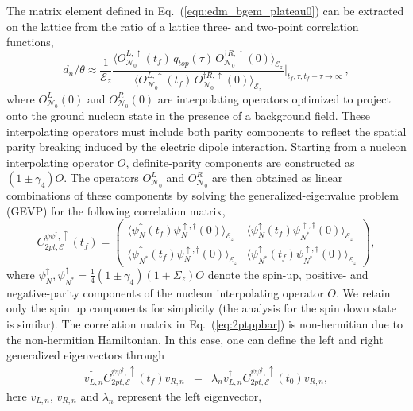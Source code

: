 \documentclass[aps,prl,twocolumn,superscriptaddress,nofootinbib]{revtex4-2}
\newcommand{\bea}{\begin{eqnarray}}
\newcommand{\eea}{\end{eqnarray}}
\newcommand{\mcE}{{\mathcal E}}
\newcommand{\la}{\langle}
\newcommand{\ra}{\rangle}
\begin{document}
The matrix element defined in Eq.~(\ref{eqn:edm_bgem_plateau0}) can be extracted on the lattice from the ratio of a
lattice three- and two-point correlation functions,
\begin{equation}
\label{eqn:edm_bgem_plateau}
d_n/\bar{\theta} 
\approx \frac{1}{\mcE_z} 
  \frac{ \la O^{L,\uparrow}_{\mathcal{N}_0}(t_f) \, q_{top}(\tau) \,  O^{\dag R,\uparrow}_{\mathcal{N}_0}(0)\ra_{\mcE_z}}
       { \la O^{L,\uparrow}_{\mathcal{N}_0}(t_f) \, O^{\dag
R,\uparrow}_{\mathcal{N}_0}(0)\ra_{\mcE_z}}\Bigg|_{t_f,\tau,
t_f-\tau\rightarrow\infty}\,,
\end{equation}
where $O^L_{\mathcal{N}_0}(0)$ and $O^R_{\mathcal{N}_0}(0)$ are interpolating operators optimized to
project onto the ground nucleon state in the presence of a background field. 
These interpolating operators must include both parity components to reflect
the spatial parity breaking induced by the electric dipole interaction. Starting from a nucleon interpolating operator $O$, definite-parity components are constructed as $(1\pm\gamma_4)O$. The operators $O^L_{\mathcal{N}_0}$  and $O^R_{\mathcal{N}_0}$ are then obtained as linear combinations of these components by solving the generalized-eigenvalue problem (GEVP) for the following correlation matrix,
\begin{equation}\label{eq:2ptppbar}
C^{\psi\psi^\dag,\uparrow}_{2pt,\mcE}(t_f)
=\left(\begin{array}{cc} \la\psi^\uparrow_N(t_f) \psi^{\uparrow,\dag}_{N}(0)\ra_{\mcE_z}  & \la\psi^\uparrow_N (t_f)\psi^{\uparrow,\dag}_{N^*}(0)\ra_{\mcE_z}  \\
\la\psi^\uparrow_{N^*}(t_f) \psi^{\uparrow,\dag}_{N}(0)\ra_{\mcE_z} &  \la\psi^\uparrow_{N^*}(t_f) \psi^{\uparrow,\dag}_{N^*}(0)\ra_{\mcE_z}\end{array}\right),
\end{equation}
where $\psi^\uparrow_N,\psi^\uparrow_{N^*}=\frac14(1\pm\gamma_4)(1+\Sigma_z)O$ 
denote the spin-up, positive- and negative-parity components of the nucleon interpolating operator $O$.
We retain only the spin up components for simplicity (the analysis for the spin down state is similar). The correlation matrix in Eq.~(\ref{eq:2ptppbar}) is non-hermitian
due to the non-hermitian Hamiltonian. 
In this case, one can define the left  and right generalized eigenvectors through 
\bea\label{eq:nonHGEVP}
v^\dagger_{L,n}C^{\psi\psi^\dag,\uparrow}_{2pt,\mcE}(t_f)v_{R,n} &=&\lambda_n v^\dagger_{L,n}  C^{\psi\psi^\dag,\uparrow}_{2pt,\mcE}(t_0)v_{R,n}, 
\eea
here $v_{L,n}$, $v_{R,n}$ and $\lambda_n$ represent the left eigenvector, 
\end{document}
